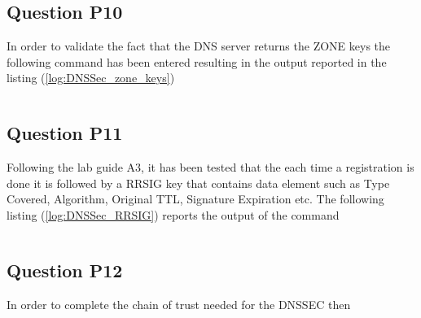 \inputminted{text}{DNSSec_tree.txt}
\label{log:DNSSec_tree}

\subsection{Question P10}
In order to validate the fact that the DNS server returns the ZONE keys the following command has been entered resulting in the output reported in the listing (\ref{log:DNSSec_zone_keys}) 

\inputminted{text}{DNSSec_zone_keys.txt}
\label{log:DNSSec_zone_keys}

\subsection{Question P11}
Following the lab guide A3, it has been tested that the each time a registration is done it is followed by a RRSIG key that contains data element such as Type Covered, Algorithm, Original TTL, Signature Expiration etc. The following listing (\ref{log:DNSSec_RRSIG}) reports the output of the command 

\inputminted{text}{DNSSec_RRSIG.txt}
\label{log:DNSSec_RRSIG}

\subsection{Question P12}
In order to complete the chain of trust needed for the DNSSEC then 


